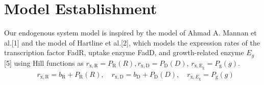 \documentclass[UTF8]{article}
\begin{document}
\section{Model Establishment}

Our endogenous system model is inspired by the model of Ahmad A. Mannan et al.[1] and the model of Hartline et al.[2], which models the expression rates of the transcription factor FadR, uptake enzyme FadD, and growth-related enzyme $E_g$ [5] using Hill functions as $r_{\mathrm{x}, \mathrm{R}}=P_{\mathrm{R}}(R), r_{\mathrm{x}, \mathrm{D}}=P_{\mathrm{D}}(D)$, $r_{\mathrm{x}, \mathrm{E}_{\mathrm{g}}}=P_{\mathrm{g}}\left(g\right)$. 
\begin{equation}
	\begin{aligned}
		& r_{\mathrm{x}, \mathrm{R}}=b_{\mathrm{R}}+P_{\mathrm{R}}(R), 
		\quad r_{\mathrm{x}, \mathrm{D}}=b_{\mathrm{D}}+P_{\mathrm{D}}(D), 
		\quad r_{\mathrm{x}, E_{\mathrm{g}}}= P_{\mathrm{g}}(g)
	\end{aligned}
\end{equation}
\end{document}
